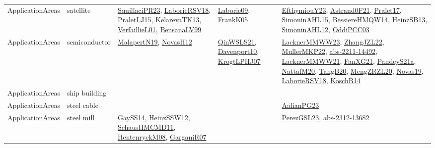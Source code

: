 {\begin{longtable}{llp{6cm}p{6cm}p{6cm}}
ApplicationAreas & satellite & \href{papers/SquillaciPR23.pdf}{SquillaciPR23}\cite{SquillaciPR23}, \href{articles/LaborieRSV18.pdf}{LaborieRSV18}\cite{LaborieRSV18}, \href{papers/PraletLJ15.pdf}{PraletLJ15}\cite{PraletLJ15}, \href{papers/KelarevaTK13.pdf}{KelarevaTK13}\cite{KelarevaTK13}, \href{papers/VerfaillieL01.pdf}{VerfaillieL01}\cite{VerfaillieL01}, \href{articles/BensanaLV99.pdf}{BensanaLV99}\cite{BensanaLV99} & \href{papers/Laborie09.pdf}{Laborie09}\cite{Laborie09}, \href{papers/FrankK05.pdf}{FrankK05}\cite{FrankK05} & \href{papers/EfthymiouY23.pdf}{EfthymiouY23}\cite{EfthymiouY23}, \href{papers/Astrand0F21.pdf}{Astrand0F21}\cite{Astrand0F21}, \href{papers/Pralet17.pdf}{Pralet17}\cite{Pralet17}, \href{articles/SimoninAHL15.pdf}{SimoninAHL15}\cite{SimoninAHL15}, \href{papers/BessiereHMQW14.pdf}{BessiereHMQW14}\cite{BessiereHMQW14}, \href{articles/HeinzSB13.pdf}{HeinzSB13}\cite{HeinzSB13}, \href{papers/SimoninAHL12.pdf}{SimoninAHL12}\cite{SimoninAHL12}, \href{papers/OddiPCC03.pdf}{OddiPCC03}\cite{OddiPCC03}\\
ApplicationAreas & semiconductor & \href{papers/MalapertN19.pdf}{MalapertN19}\cite{MalapertN19}, \href{articles/NovasH12.pdf}{NovasH12}\cite{NovasH12} & \href{articles/QinWSLS21.pdf}{QinWSLS21}\cite{QinWSLS21}, \href{papers/Davenport10.pdf}{Davenport10}\cite{Davenport10}, \href{papers/KrogtLPHJ07.pdf}{KrogtLPHJ07}\cite{KrogtLPHJ07} & \href{articles/LacknerMMWW23.pdf}{LacknerMMWW23}\cite{LacknerMMWW23}, \href{papers/ZhangJZL22.pdf}{ZhangJZL22}\cite{ZhangJZL22}, \href{articles/MullerMKP22.pdf}{MullerMKP22}\cite{MullerMKP22}, \href{articles/abs-2211-14492.pdf}{abs-2211-14492}\cite{abs-2211-14492}, \href{papers/LacknerMMWW21.pdf}{LacknerMMWW21}\cite{LacknerMMWW21}, \href{articles/FanXG21.pdf}{FanXG21}\cite{FanXG21}, \href{articles/PandeyS21a.pdf}{PandeyS21a}\cite{PandeyS21a}, \href{papers/NattafM20.pdf}{NattafM20}\cite{NattafM20}, \href{papers/TangB20.pdf}{TangB20}\cite{TangB20}, \href{articles/MengZRZL20.pdf}{MengZRZL20}\cite{MengZRZL20}, \href{articles/Novas19.pdf}{Novas19}\cite{Novas19}, \href{articles/LaborieRSV18.pdf}{LaborieRSV18}\cite{LaborieRSV18}, \href{papers/KoschB14.pdf}{KoschB14}\cite{KoschB14}\\
ApplicationAreas & ship building &  &  & \\
ApplicationAreas & steel cable &  &  & \href{papers/AalianPG23.pdf}{AalianPG23}\cite{AalianPG23}\\
ApplicationAreas & steel mill & \href{papers/GaySS14.pdf}{GaySS14}\cite{GaySS14}, \href{articles/HeinzSSW12.pdf}{HeinzSSW12}\cite{HeinzSSW12}, \href{articles/SchausHMCMD11.pdf}{SchausHMCMD11}\cite{SchausHMCMD11}, \href{papers/HentenryckM08.pdf}{HentenryckM08}\cite{HentenryckM08}, \href{papers/GarganiR07.pdf}{GarganiR07}\cite{GarganiR07} &  & \href{papers/PerezGSL23.pdf}{PerezGSL23}\cite{PerezGSL23}, \href{articles/abs-2312-13682.pdf}{abs-2312-13682}\cite{abs-2312-13682}\\

\end{longtable}}
